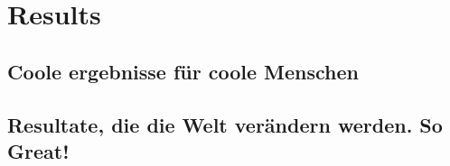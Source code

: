 \section{Results}

\subsection{Coole ergebnisse für coole Menschen}

\subsection{Resultate, die die Welt verändern werden. So Great!}
